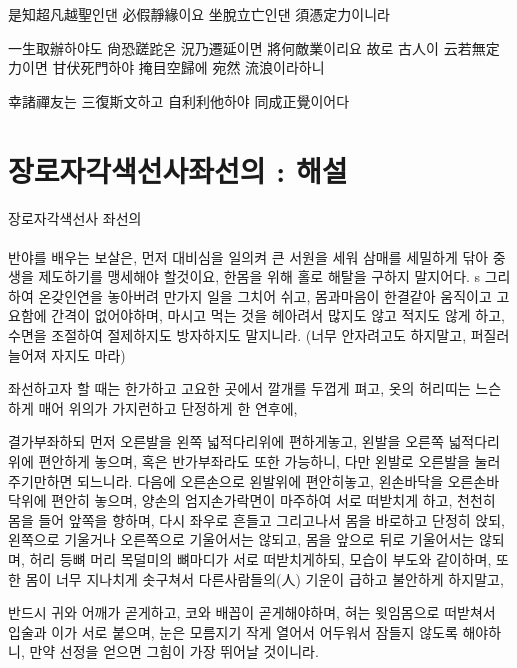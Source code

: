 \documentclass[12pt, a4paper, oneside]{book}
\let\stdsection\section
\renewcommand\section{\newpage\stdsection}
\begin{document}
是知超凡越聖인댄 必假靜緣이요 坐脫立亡인댄 須憑定力이니라

一生取辦하야도 尙恐蹉跎온 況乃遷延이면 將何敵業이리요 故로 古人이 云若無定力이면 甘伏死門하야 掩目空歸에 宛然 流浪이라하니

幸諸禪友는 三復斯文하고 自利利他하야 同成正覺이어다

 
%
	\section{장로자각색선사좌선의 : 해설}

 

장로자각색선사 좌선의  

\paragraph{}
반야를 배우는 보살은, 먼저 대비심을 일의켜 큰 서원을 세워 삼매를 세밀하게 닦아 중생을 제도하기를 맹세해야 할것이요, 한몸을 위해 홀로 해탈을 구하지 말지어다.
s
그리하여 온갖인연을 놓아버려 만가지 일을 그치어 쉬고, 몸과마음이 한결같아 움직이고 고요함에 간격이 없어야하며, 마시고 먹는 것을 헤아려서 많지도 않고 적지도 않게 하고, 수면을 조절하여 절제하지도 방자하지도 말지니라. (너무 안자려고도 하지말고, 퍼질러 늘어져 자지도 마라)

좌선하고자 할 때는 한가하고 고요한 곳에서 깔개를 두껍게 펴고, 옷의 허리띠는 느슨하게 매어 위의가 가지런하고 단정하게 한 연후에,

결가부좌하되 먼저 오른발을 왼쪽 넓적다리위에 편하게놓고, 왼발을 오른쪽 넓적다리위에 편안하게 놓으며, 혹은 반가부좌라도 또한 가능하니, 다만 왼발로 오른발을 눌러주기만하면 되느니라. 다음에 오른손으로 왼발위에 편안히놓고, 왼손바닥을 오른손바닥위에 편안히 놓으며, 양손의 엄지손가락면이 마주하여 서로 떠받치게 하고, 천천히 몸을 들어 앞쪽을 향하며, 다시 좌우로 흔들고 그리고나서 몸을 바로하고 단정히 앉되, 왼쪽으로 기울거나 오른쪽으로 기울어서는 않되고, 몸을 앞으로 뒤로 기울어서는 않되며, 허리 등뼈 머리 목덜미의 뼈마디가 서로 떠받치게하되, 모습이 부도와 같이하며, 또한 몸이 너무 지나치게 솟구쳐서 다른사람들의(人) 기운이 급하고 불안하게 하지말고,

반드시 귀와 어깨가 곧게하고, 코와 배꼽이 곧게해야하며, 혀는 윗임몸으로 떠받쳐서 입술과 이가 서로 붙으며, 눈은 모름지기 작게 열어서 어두워서 잠들지 않도록 해야하니, 만약 선정을 얻으면 그힘이 가장 뛰어날 것이니라.
\end{document}
